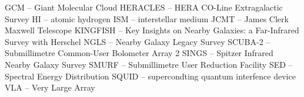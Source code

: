 GCM -- Giant Molecular Cloud
HERACLES -- HERA CO-Line Extragalactic Survey
HI -- atomic hydrogen
ISM -- interstellar medium
JCMT -- James Clerk Maxwell Telescope
KINGFISH -- Key Insights on Nearby Galaxies: a Far-Infrared Survey with Herschel
NGLS -- Nearby Galaxy Legacy Survey
SCUBA-2 -- Submillimetre Common-User Bolometer Array 2
SINGS -- Spitzer Infrared Nearby Galaxy Survey
SMURF -- Submillimetre User Reduction Facility
SED -- Spectral Energy Distribution
SQUID -- supercondting quantum interfence device
VLA -- Very Large Array
